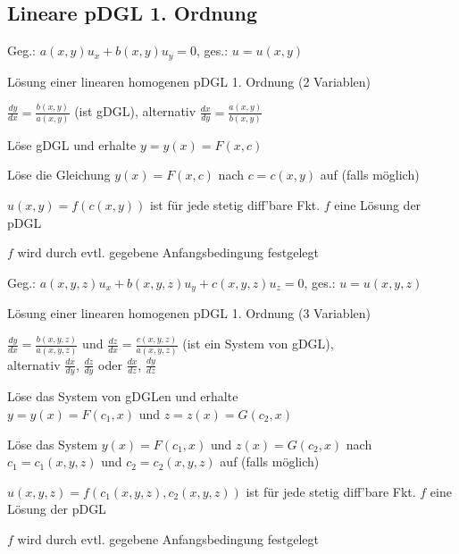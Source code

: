 \documentclass[german,color,5pt]{latex4ei/latex4ei_fs}
\begin{document}
\begin{sectionbox}
	\subsection{Lineare pDGL 1. Ordnung}
	Geg.: $a(x,y)u_x+b(x,y)u_y=0$, ges.: $u=u(x,y)$
	\begin{cookbox}{Lösung einer linearen homogenen pDGL 1. Ordnung (2 Variablen)}
		\item $\frac{dy}{dx}=\frac{b(x,y)}{a(x,y)}$ (ist gDGL), alternativ $\frac{dx}{dy}=\frac{a(x,y)}{b(x,y)}$ 
		\item Löse gDGL und erhalte $y=y(x)=F(x,c) $
		\item Löse die Gleichung $y(x)=F(x,c)$ nach $c = c(x,y)$ auf (falls möglich)
		\item $u(x,y)=f(c(x,y))$ ist für jede stetig diff'bare Fkt. $f$ eine Lösung der pDGL
		\item $f$ wird durch evtl. gegebene Anfangsbedingung festgelegt
	\end{cookbox}
	\label{subsubsec:linpdgl}
	Geg.: $a(x,y,z)u_x+b(x,y,z)u_y+c(x,y,z)u_z=0$, ges.: $u=u(x,y,z)$
	\begin{cookbox}{Lösung einer linearen homogenen pDGL 1. Ordnung (3 Variablen)}
		\item $\frac{dy}{dx}=\frac{b(x,y,z)}{a(x,y,z)}$ und $\frac{dz}{dx}=\frac{c(x,y,z)}{a(x,y,z)}$ (ist ein System von gDGL), \\
			alternativ $\frac{dx}{dy}$, $\frac{dz}{dy}$ oder $\frac{dx}{dz}$, $\frac{dy}{dz}$
		\item Löse das System von gDGLen und erhalte \\$y=y(x)=F(c_{1},x) $ und $z=z(x)=G(c_{2},x) $
		\item Löse das System $y(x)=F(c_{1},x) $ und $z(x)=G(c_{2},x) $ nach $c_{1}=c_{1}(x,y,z) $ und $c_{2}=c_{2}(x,y,z) $ auf (falls möglich)
		\item $ u(x,y,z)=f(c_{1}(x,y,z),c_{2}(x,y,z))$ ist für jede stetig diff'bare Fkt. $f$ eine Lösung der pDGL
		\item $f $ wird durch evtl. gegebene Anfangsbedingung festgelegt
	\end{cookbox}
\end{sectionbox}
\end{document}
